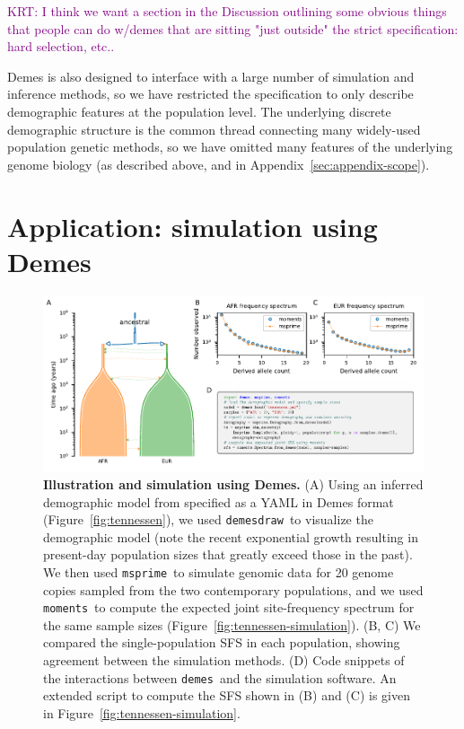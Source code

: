 \documentclass[11pt]{article}
\newcommand{\msprime}[0]{\texttt{msprime}}
\newcommand{\demes}[0]{\texttt{demes}}
\newcommand{\demesdraw}[0]{\texttt{demesdraw}}
\newcommand{\moments}[0]{\texttt{moments}}
\newcommand{\krtcomment}[1]{{\textcolor{purple}{KRT: #1}}}
\begin{document}
\krtcomment{
    I think we want a section in the Discussion outlining some obvious things
    that people can do w/demes that are sitting "just outside" the strict
    specification: hard selection, etc..
}

Demes is also designed to interface with a large number of simulation and
inference methods, so we have restricted the specification to only
describe demographic features at the population level.
The underlying discrete demographic structure is the common thread connecting
many widely-used population genetic methods, so we have omitted many
features of the underlying genome biology (as described above, and in
Appendix~\ref{sec:appendix-scope}).

\section*{Application: simulation using Demes}

\begin{figure}[tb!]
    \centering
    \includegraphics{fig/showcase}
    \caption{
        \textbf{Illustration and simulation using Demes.}
        (A)
        Using an inferred demographic model from \citet{tennessen2012evolution}
        specified as a YAML in Demes format (Figure~\ref{fig:tennessen}), we
        used \demesdraw\ to visualize the demographic model (note the recent
            exponential growth resulting in present-day population sizes that
        greatly exceed those in the past).
        We then used \msprime\ to simulate genomic data for 20 genome copies
        sampled from the two contemporary populations, and we used \moments\
        to compute the expected joint site-frequency spectrum for the same
        sample sizes (Figure~\ref{fig:tennessen-simulation}).
        (B, C) We compared the single-population SFS in each population, showing
        agreement between the simulation methods.
        (D) Code snippets of the interactions between \demes\ and the simulation
        software. An extended script to compute the SFS shown in (B) and (C) is
        given in Figure~\ref{fig:tennessen-simulation}.
    }
    \label{fig:showcase}
\end{figure}
\end{document}

